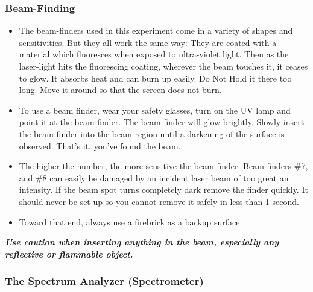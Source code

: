 \documentclass{../lab}
\begin{document}
\subsubsection{Beam-Finding}

\begin{itemize}
    \item The beam-finders used in this experiment come in a variety of shapes and sensitivities. But they all work the same way: They are coated with a material which fluoresces when exposed to ultra-violet light. Then as the laser-light hits the fluorescing coating, wherever the beam touches it, it ceases to glow. It absorbs heat and can burn up easily. Do Not Hold it there too long. Move it around so that the screen does not burn.

    \item To use a beam finder, wear your safety glasses, turn on the UV lamp and point it at the beam finder. The beam finder will glow brightly. Slowly insert the beam finder into the beam region until a darkening of the surface is observed. That's it, you've found the beam.

    \item The higher the number, the more sensitive the beam finder. Beam finders \#7, and \#8 can easily be damaged by an incident laser beam of too great an intensity. If the beam spot turns completely dark remove the finder quickly. It should never be set up so you cannot remove it safely in less than 1 second.

    \item Toward that end, always use a firebrick as a backup surface.
\end{itemize}

\emph{\textbf{Use caution when inserting anything in the beam, especially any reflective or flammable object.}}

\subsubsection{The Spectrum Analyzer (Spectrometer)}
\end{document}
